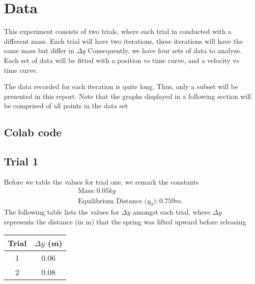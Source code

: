 \documentclass{report}
\begin{document}
\bigbreak \noindent 
\section{Data}
\bigbreak \noindent 
This experiment consists of two trials, where each trial in conducted with a different mass. Each trial will have two iterations, these iterations will have the same mass but differ in $\Delta y$
\bigbreak \noindent 
Consequently, we have four sets of data to analyze. Each set of data will be fitted with a position vs time curve, and a velocity vs time curve.
\bigbreak \noindent 
\begin{remark}
    The data recorded for each iteration is quite long. Thus, only a subset will be presented in this report. Note that the graphs displayed in a following section will be comprised of all points in the data set 
\end{remark}

\pagebreak 
\subsection{Colab code}
\bigbreak \noindent 
{}



\pagebreak 
\subsection{Trial 1}
\bigbreak \noindent 
Before we table the values for trial one, we remark the constants
\begin{align*}
        &\text{Mass:}\ 0.05kg\\
        &\text{Equilibrium Distance ($y_{0}$):}\ 0.759m
    .\end{align*}
    \bigbreak \noindent 
    \bigbreak \noindent 
    The following table lists the values for $\Delta y$ amongst each trial, where $\Delta y$ represents the distance (in m) that the spring was lifted upward before releasing
    \begin{center}
        \begin{tabular}{c|c}
            Trial & $\Delta y$ (m) \\
            \hline
            1 & 0.06 \\
            2 & 0.08
        \end{tabular}
    \end{center}
    \tc{}
    \bigbreak \noindent 
\end{document}
